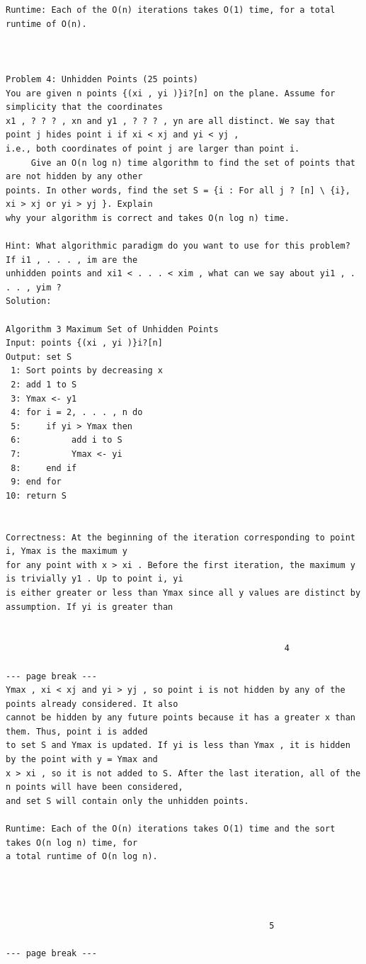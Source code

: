 \documentclass[12pt]{article}
\begin{document}
\begin{Verbatim}[breaklines=true,fontsize=\small]
Runtime: Each of the O(n) iterations takes O(1) time, for a total runtime of O(n).



Problem 4: Unhidden Points (25 points)
You are given n points {(xi , yi )}i?[n] on the plane. Assume for simplicity that the coordinates
x1 , ? ? ? , xn and y1 , ? ? ? , yn are all distinct. We say that point j hides point i if xi < xj and yi < yj ,
i.e., both coordinates of point j are larger than point i.
     Give an O(n log n) time algorithm to find the set of points that are not hidden by any other
points. In other words, find the set S = {i : For all j ? [n] \ {i}, xi > xj or yi > yj }. Explain
why your algorithm is correct and takes O(n log n) time.

Hint: What algorithmic paradigm do you want to use for this problem? If i1 , . . . , im are the
unhidden points and xi1 < . . . < xim , what can we say about yi1 , . . . , yim ?
Solution:

Algorithm 3 Maximum Set of Unhidden Points
Input: points {(xi , yi )}i?[n]
Output: set S
 1: Sort points by decreasing x
 2: add 1 to S
 3: Ymax <- y1
 4: for i = 2, . . . , n do
 5:     if yi > Ymax then
 6:          add i to S
 7:          Ymax <- yi
 8:     end if
 9: end for
10: return S


Correctness: At the beginning of the iteration corresponding to point i, Ymax is the maximum y
for any point with x > xi . Before the first iteration, the maximum y is trivially y1 . Up to point i, yi
is either greater or less than Ymax since all y values are distinct by assumption. If yi is greater than


                                                       4

--- page break ---
Ymax , xi < xj and yi > yj , so point i is not hidden by any of the points already considered. It also
cannot be hidden by any future points because it has a greater x than them. Thus, point i is added
to set S and Ymax is updated. If yi is less than Ymax , it is hidden by the point with y = Ymax and
x > xi , so it is not added to S. After the last iteration, all of the n points will have been considered,
and set S will contain only the unhidden points.

Runtime: Each of the O(n) iterations takes O(1) time and the sort takes O(n log n) time, for
a total runtime of O(n log n).




                                                    5

--- page break ---
\end{Verbatim}
\end{document}
